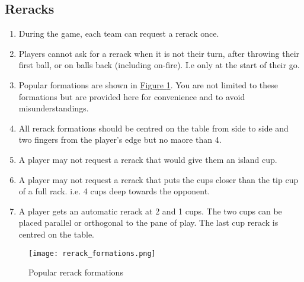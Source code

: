 	\subsection{Reracks}\label{ssec:Rerack}
		\begin{enumerate}[label=(\roman*), ref=\roman*]
            \item \label{sssec:Rerack,number} During the game, each team can request a rerack once.
            \item \label{sssec:Rerack,notallowed} Players cannot ask for a rerack when it is not their turn, after throwing their first ball, or on balls back (including on-fire).
                I.e only at the start of their go.
            \item \label{sssec:Rerack,pop_forms} Popular formations are shown in \hyperref[fig:rerack_forms]{Figure \ref*{fig:rerack_forms}}.
                You are not limited to these formations but are provided here for convenience and to avoid misunderstandings. 
            \item \label{sssec:Rerack,centering} All rerack formations should be centred on the table from side to side and two fingers from the player's edge but no maore than 4.
            \item \label{sssec:Rerack,Island} A player may not request a rerack that would give them an island cup.
            \item \label{sssec:Rerack,4cupdeep} A player may not request a rerack that puts the cups closer than the tip cup of a full rack.
                i.e. 4 cups deep towards the opponent.
            \item \label{sssec:Rerack,autoreracks} A player gets an automatic rerack at 2 and 1 cups.
                The two cups can be placed parallel or orthogonal to the pane of play.
                The last cup rerack is centred on the table.
        \end{enumerate}
        \begin{figure}[H]
            \centering
            \texttt{[image: rerack\_formations.png]}
            \caption{Popular rerack formations}
            \label{fig:rerack_forms}
        \end{figure}

